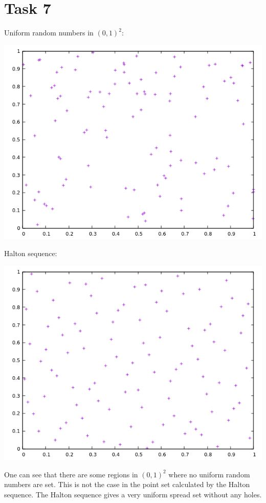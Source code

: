 \documentclass[10pt,a4paper]{article}
\begin{document}
\newpage
\section*{Task 7}

Uniform random numbers in $(0,1)^2$:
\begin{center}
\includegraphics[scale=0.5]{uniform_random_numbers.png}		
\end{center}

Halton sequence:
\begin{center}
\includegraphics[scale=0.5]{halton_sequence.png}		
\end{center}

One can see that there are some regions in $(0,1)^2$ where no uniform random numbers are set. This is not the case in the point set calculated by the Halton sequence. The Halton sequence gives a very uniform spread set without any holes.
\end{document}
